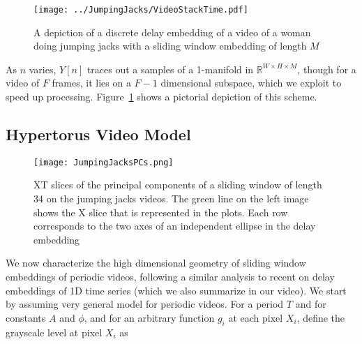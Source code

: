 \documentclass[a4paper,UKenglish]{lipics}
\begin{document}
\begin{figure}[]
	\centering
	\texttt{[image: ../JumpingJacks/VideoStackTime.pdf]}
	\caption{A depiction of a discrete delay embedding of a video of a woman doing jumping jacks with a sliding window embedding of length $M$}
	\label{fig:VideoDiscreteDelayEmbedding}
\end{figure}

As $n$ varies, $Y[n]$ traces out a samples of a 1-manifold in $\mathbb{R}^{W \times H \times M}$, though for a video of $F$ frames, it lies on a $F-1$ dimensional subspace, which we exploit to speed up processing. Figure~\ref{fig:VideoDiscreteDelayEmbedding} shows a pictorial depiction of this scheme.

\subsection{Hypertorus Video Model}
\label{sec:VideoModel}

\begin{figure}[]
	\centering
	\texttt{[image: JumpingJacksPCs.png]}
	\caption{XT slices of the principal components of a sliding window of length 34 on the jumping jacks videos.  The green line on the left image shows the X slice that is represented in the plots.  Each row corresponds to the two axes of an independent ellipse in the delay embedding}
	\label{fig:JumpingJacksPCs}
\end{figure}


We now characterize the high dimensional geometry of sliding window embeddings of periodic videos, following a similar analysis to recent on delay embeddings of 1D time series \cite{perea2013sliding} (which we also summarize in our video).  We start by assuming very general model for periodic videos.  For a period $T$ and for constants $A$ and $\phi$, and for an arbitrary function $g_i$ at each pixel $X_i$, define the grayscale level at pixel $X_i$ as 
\end{document}
